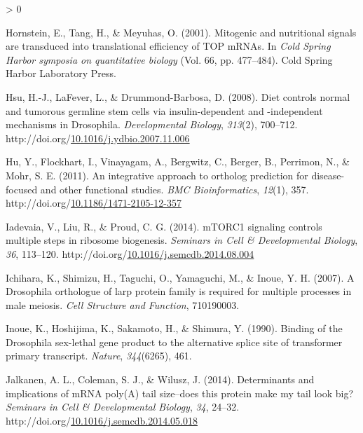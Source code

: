 \documentclass[12pt,oneside]{reedthesis}
\newlength{\cslhangindent}
\newenvironment{CSLReferences}[2] %
 {%
  \setlength{\parindent}{0pt}
  \ifodd #1 \everypar{\setlength{\hangindent}{\cslhangindent}}\ignorespaces\fi
  \ifnum #2 > 0
  \setlength{\parskip}{#2\baselineskip}
  \fi
 }%
 {}
\begin{document}
\begin{CSLReferences}{1}{0}
\leavevmode\hypertarget{ref-Hornstein2001a}{}%
Hornstein, E., Tang, H., \& Meyuhas, O. (2001). Mitogenic and nutritional signals are transduced into translational efficiency of {TOP mRNAs}. In \emph{Cold {Spring Harbor} symposia on quantitative biology} (Vol. 66, pp. 477--484). {Cold Spring Harbor Laboratory Press}.

\leavevmode\hypertarget{ref-hsuDietControlsNormal2008}{}%
Hsu, H.-J., LaFever, L., \& Drummond-Barbosa, D. (2008). Diet controls normal and tumorous germline stem cells via insulin-dependent and -independent mechanisms in {Drosophila}. \emph{Developmental Biology}, \emph{313}(2), 700--712. http://doi.org/\href{https://doi.org/10.1016/j.ydbio.2007.11.006}{10.1016/j.ydbio.2007.11.006}

\leavevmode\hypertarget{ref-huIntegrativeApproachOrtholog2011}{}%
Hu, Y., Flockhart, I., Vinayagam, A., Bergwitz, C., Berger, B., Perrimon, N., \& Mohr, S. E. (2011). An integrative approach to ortholog prediction for disease-focused and other functional studies. \emph{BMC Bioinformatics}, \emph{12}(1), 357. http://doi.org/\href{https://doi.org/10.1186/1471-2105-12-357}{10.1186/1471-2105-12-357}

\leavevmode\hypertarget{ref-iadevaiaMTORC1SignalingControls2014}{}%
Iadevaia, V., Liu, R., \& Proud, C. G. (2014). {mTORC1} signaling controls multiple steps in ribosome biogenesis. \emph{Seminars in Cell \& Developmental Biology}, \emph{36}, 113--120. http://doi.org/\href{https://doi.org/10.1016/j.semcdb.2014.08.004}{10.1016/j.semcdb.2014.08.004}

\leavevmode\hypertarget{ref-Ichihara2007a}{}%
Ichihara, K., Shimizu, H., Taguchi, O., Yamaguchi, M., \& Inoue, Y. H. (2007). A {Drosophila} orthologue of larp protein family is required for multiple processes in male meiosis. \emph{Cell Structure and Function}, 710190003.

\leavevmode\hypertarget{ref-Inoue1990}{}%
Inoue, K., Hoshijima, K., Sakamoto, H., \& Shimura, Y. (1990). Binding of the {Drosophila} sex-lethal gene product to the alternative splice site of transformer primary transcript. \emph{Nature}, \emph{344}(6265), 461.

\leavevmode\hypertarget{ref-Jalkanen2014h}{}%
Jalkanen, A. L., Coleman, S. J., \& Wilusz, J. (2014). Determinants and implications of {mRNA} poly({A}) tail size--does this protein make my tail look big? \emph{Seminars in Cell \& Developmental Biology}, \emph{34}, 24--32. http://doi.org/\href{https://doi.org/10.1016/j.semcdb.2014.05.018}{10.1016/j.semcdb.2014.05.018}


\end{CSLReferences}
\end{document}
